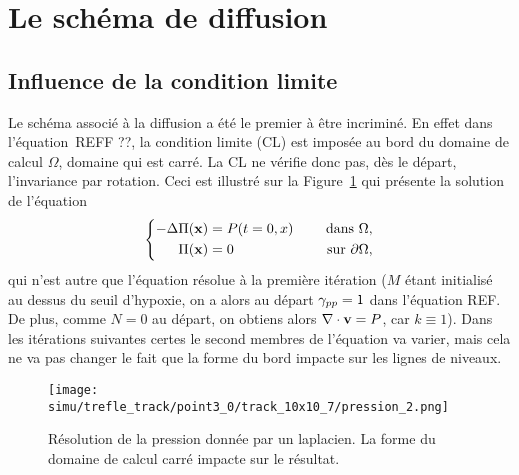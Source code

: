\documentclass[main.tex]{subfiles}
\begin{document}
\section{Le schéma de diffusion}
\subsection{Influence de la condition limite}
Le schéma associé à la diffusion a été le premier à être incriminé. En effet dans l'équation~REFF ??, la condition limite (CL) est imposée au bord du domaine de calcul $\Omega$, domaine qui est carré. La CL ne vérifie donc pas, dès le départ, l'invariance par rotation. Ceci est illustré sur la Figure~\ref{fig:ligne_nvx_laplace_carre} qui présente la solution de l'équation
\begin{equation}\label{eq:pression_iter1}
\left\{
\begin{aligned}
-\Delta \Pi(\mathbf{x}) &= P(t=0,x) & \quad \textrm{ dans }  \Omega , \\
\Pi(\mathbf{x}) &=0 & \quad \textrm{ sur  } \partial \Omega,
\end{aligned}
\right.
\end{equation}
qui n'est autre que l'équation résolue à la première itération ($M$ étant initialisé au dessus du seuil d'hypoxie, on a alors au départ $\gamma_{pp}=1$ dans l'équation REF. De plus, comme $N=0$ au départ, on obtiens alors $\nabla\cdot \mathbf{v} = P$, car $k\equiv1$). Dans les itérations suivantes certes le second membres de l'équation va varier, mais cela ne va pas changer le fait que la forme du bord impacte sur les lignes de niveaux.
\begin{figure}
\centering
\texttt{[image: simu/trefle\_track/point3\_0/track\_10x10\_7/pression\_2.png]}
\vspace{-4mm}\\
\caption{\label{fig:ligne_nvx_laplace_carre} Résolution de la pression donnée par un laplacien. La forme du domaine de calcul carré impacte sur le résultat.}
\end{figure}
\end{document}
